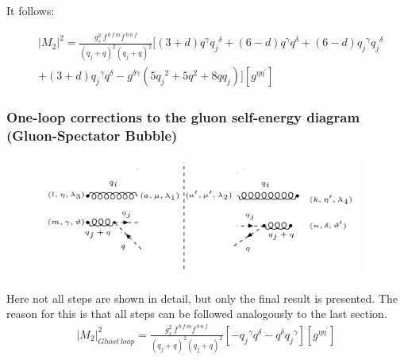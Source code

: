 It follows:

\begin{equation}
\begin{split}
&|M_2|^2=\frac{g_s^2\: f^{\:b\:f\:m} f^{\:b\:n\:f}}{(q_j +q)^2 (q_j +q)^2}[(3+d)q^{\gamma}{q_j}^{\delta}+(6-d)q^{\gamma}{q}^{\delta}+(6-d){q_j}^{\gamma}{q_j}^{\delta}\\
&+(3+d){q_j}^{\gamma}{q}^{\delta}-g^{{\delta}{\gamma}}(5{q_j}^2+5q^2+8qq_j)][g^{{\eta}{{\eta}^{\prime}}}]
\end{split}
\end{equation}





\pagebreak
\subsubsection{One-loop corrections to the gluon self-energy diagram (Gluon-Spectator Bubble)}
\begin{figure}[h!]
\centering
\includegraphics[width=0.95\textwidth]{images/GG/GhostM2.png}
\end{figure}
Here not all steps are shown in detail, but only the final result is presented. The reason for this is that all steps can be followed analogously to the last section.
\begin{equation}
\begin{split}
{{|M_2|}^2_{Ghost \:loop}}=\frac{g_s^2 \:f^{\:b\:f\:m} f^{\:b\:n\:f}}{(q_j +q)^2 (q_j +q)^2} [-{q_j}^{{\gamma}}{q}^{{\delta}}-{q}^{{\delta}}{q_j}^{{\gamma}}][g^{{\eta}{{\eta}^{\prime}}}]
\end{split}
\end{equation}

